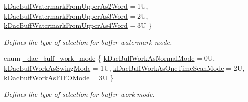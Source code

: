 \begin{DoxyCompactItemize}
\hyperlink{group__dac__hal_ggaca326abf4ffaa1ea20eb364e519361a0a5a346e793da6b1b526c0248c102a48d8}{k\+Dac\+Buff\+Watermark\+From\+Upper\+As2\+Word} = 1U, 
\hyperlink{group__dac__hal_ggaca326abf4ffaa1ea20eb364e519361a0ae6d8f7bbe66f6de9d0ec35a178232019}{k\+Dac\+Buff\+Watermark\+From\+Upper\+As3\+Word} = 2U, 
\hyperlink{group__dac__hal_ggaca326abf4ffaa1ea20eb364e519361a0aaf255f2adfa168542b40b15603c15029}{k\+Dac\+Buff\+Watermark\+From\+Upper\+As4\+Word} = 3U
 \}\begin{DoxyCompactList}\small\item\em Defines the type of selection for buffer watermark mode. \end{DoxyCompactList}
\item 
enum \hyperlink{group__dac__hal_gaf2d8ceb9806aee0678374a5ca01aaae4}{\+\_\+dac\+\_\+buff\+\_\+work\+\_\+mode} \{ \hyperlink{group__dac__hal_ggaf2d8ceb9806aee0678374a5ca01aaae4aa2997592c55b3dbf49753be4e65cee77}{k\+Dac\+Buff\+Work\+As\+Normal\+Mode} = 0U, 
\hyperlink{group__dac__hal_ggaf2d8ceb9806aee0678374a5ca01aaae4a3a3618062a2184fd97c7cbf8683701ca}{k\+Dac\+Buff\+Work\+As\+Swing\+Mode} = 1U, 
\hyperlink{group__dac__hal_ggaf2d8ceb9806aee0678374a5ca01aaae4ad42105bc2af567609cad641792811335}{k\+Dac\+Buff\+Work\+As\+One\+Time\+Scan\+Mode} = 2U, 
\hyperlink{group__dac__hal_ggaf2d8ceb9806aee0678374a5ca01aaae4add0eafc0e3dae32fe6e5d613b019333c}{k\+Dac\+Buff\+Work\+As\+F\+I\+F\+O\+Mode} = 3U
 \}\begin{DoxyCompactList}\small\item\em Defines the type of selection for buffer work mode. \end{DoxyCompactList}
\end{DoxyCompactItemize}
